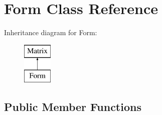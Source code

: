 \hypertarget{classForm}{
\section{Form Class Reference}
\label{classForm}
}
Inheritance diagram for Form:\begin{figure}[H]
\begin{center}
\leavevmode
\includegraphics[height=2.000000cm]{classForm}
\end{center}
\end{figure}
\subsection*{Public Member Functions}
